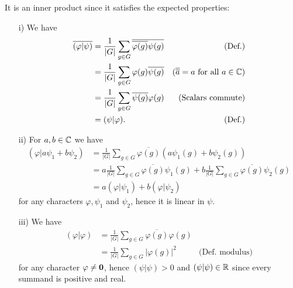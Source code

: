 It is an inner product since it satisfies the expected properties:
\begin{enumerate}
	\item[i)] We have 
	\begin{align*}
		\overline{(\varphi|\psi)} &= \frac{1}{|G|} \sum_{g \in G} \overline{\overline{\varphi(g)} {\psi(g)}} & \text{(Def.)}\\
		&= \frac{1}{|G|} \sum_{g \in G} \varphi(g) \overline{\psi(g)} & \text{($\overline{\overline{a}}=a$ for all $a \in \mathbb{C}$)}\\
		&= \frac{1}{|G|} \sum_{g \in G} \overline{\psi(g)} {\varphi(g)} & \text{(Scalars commute)}\\
		&= (\psi|\varphi). &\text{(Def.)}
	\end{align*}
	\item[ii)] For $a,b \in \mathbb{C}$ we have 
	\begin{align*}
		(\varphi | a\psi_1 + b\psi_2) &= \frac{1}{|G|} \sum_{g \in G} \overline{\varphi(g)} \left({a\psi_1(g) + b\psi_2(g)}\right) \\
		&= a\frac{1}{|G|} \sum_{g \in G} \overline{\varphi(g)} {\psi_1(g)}  +b \frac{1}{|G|} \sum_{g \in G} \overline{\varphi(g)} {\psi_2(g)}  \\
		&= a(\varphi | \psi_1 )  +b (\varphi |\psi_2) 
	\end{align*}
	for any characters $\varphi, \psi_1$ and $\psi_2$, hence it is linear in $\psi$.
	\item[iii)] We have 
	\begin{align*}
		(\varphi|\varphi) &= \frac{1}{|G|} \sum_{g \in G} \overline{\varphi(g)} {\varphi(g)} \\
		&= \frac{1}{|G|} \sum_{g \in G} |\varphi(g)|^2 & \text{(Def. modulus)}
	\end{align*}
	for any character $\varphi \neq \mathbf{0}$, hence $(\psi|\psi) > 0$ and $(\psi|\psi) \in \mathbb{R}$ since every summand is positive and real.
\end{enumerate}


